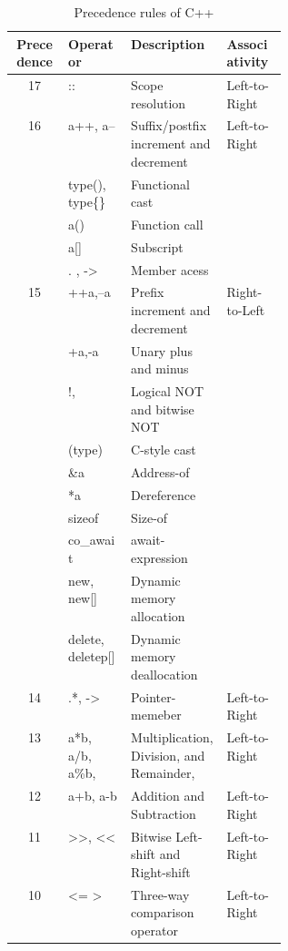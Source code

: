 \documentclass[12pt]{article}
\begin{document}
\begin{table}[h!]
    \caption{Precedence rules of C++}
    \label{table:PR1}
    \begin{tabular}{|c|l|p{0.35\linewidth}|l|}
      \toprule %
      \textbf{Precedence} & \textbf{Operator} & \textbf{Description} & \textbf{Associativity} \\
      \midrule %
      17 & :: & Scope resolution  &  Left-to-Right\\
      \hline
      \multirow{5}{5em}{16} & a++, a-- & Suffix/postfix increment and decrement & \multirow{5}{5em}{Left-to-Right} \\
   & type(), type\{\} & Functional cast & \\
      & a() & Function call & \\
      & a[] & Subscript & \\
      & . , -\textgreater & Member acess \\
      \hline
      \multirow{10}{5em}{15} & ++a,--a & Prefix increment and decrement & \multirow{10}{5em}{Right-to-Left}\\
      & +a,-a & Unary plus and minus &\\
      & !, ~ & Logical NOT and bitwise NOT &\\
      & (type) & C-style cast &\\
      & \&a & Address-of &\\
      & *a & Dereference &\\
      & sizeof & Size-of&\\
      & co\_await & await-expression &\\
      & new, new[] & Dynamic memory allocation &\\
      & delete, deletep[] & Dynamic memory deallocation &\\
      \hline
      14 & .*, -\textgreater* & Pointer-memeber &Left-to-Right\\
      \hline
      13 & a*b, a/b, a\%b, & Multiplication, Division, and Remainder, &Left-to-Right\\
      \hline
      12 & a+b, a-b & Addition and Subtraction &Left-to-Right\\
      \hline
      11 & \textgreater \textgreater , \textless \textless & Bitwise Left-shift and Right-shift &Left-to-Right\\
      \hline
      10 & \textless = \textgreater & Three-way comparison operator &Left-to-Right\\
      \hline
    \end{tabular}
  \end{table}
\end{document}
